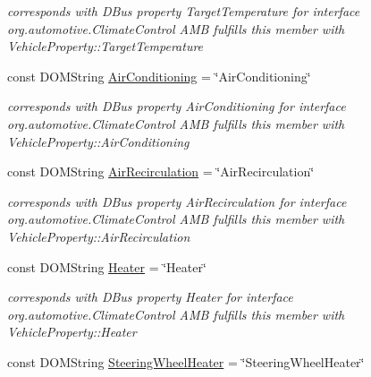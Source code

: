 \begin{DoxyCompactItemize}
\begin{DoxyCompactList}\small\item\em corresponds with D\+Bus property Target\+Temperature for interface org.\+automotive.\+Climate\+Control A\+M\+B fulfills this member with Vehicle\+Property\+::\+Target\+Temperature \end{DoxyCompactList}\item 
\hypertarget{interfaceClimateControl_a9ff614cf24e39060d34b088eb236bbb2}{const D\+O\+M\+String \hyperlink{interfaceClimateControl_a9ff614cf24e39060d34b088eb236bbb2}{Air\+Conditioning} = \char`\"{}Air\+Conditioning\char`\"{}}\label{interfaceClimateControl_a9ff614cf24e39060d34b088eb236bbb2}

\begin{DoxyCompactList}\small\item\em corresponds with D\+Bus property Air\+Conditioning for interface org.\+automotive.\+Climate\+Control A\+M\+B fulfills this member with Vehicle\+Property\+::\+Air\+Conditioning \end{DoxyCompactList}\item 
\hypertarget{interfaceClimateControl_ab72e5a305fcd31445bb825fc59cfff3b}{const D\+O\+M\+String \hyperlink{interfaceClimateControl_ab72e5a305fcd31445bb825fc59cfff3b}{Air\+Recirculation} = \char`\"{}Air\+Recirculation\char`\"{}}\label{interfaceClimateControl_ab72e5a305fcd31445bb825fc59cfff3b}

\begin{DoxyCompactList}\small\item\em corresponds with D\+Bus property Air\+Recirculation for interface org.\+automotive.\+Climate\+Control A\+M\+B fulfills this member with Vehicle\+Property\+::\+Air\+Recirculation \end{DoxyCompactList}\item 
\hypertarget{interfaceClimateControl_a543c57595a9c02c78a4d5cdd0a8115f7}{const D\+O\+M\+String \hyperlink{interfaceClimateControl_a543c57595a9c02c78a4d5cdd0a8115f7}{Heater} = \char`\"{}Heater\char`\"{}}\label{interfaceClimateControl_a543c57595a9c02c78a4d5cdd0a8115f7}

\begin{DoxyCompactList}\small\item\em corresponds with D\+Bus property Heater for interface org.\+automotive.\+Climate\+Control A\+M\+B fulfills this member with Vehicle\+Property\+::\+Heater \end{DoxyCompactList}\item 
\hypertarget{interfaceClimateControl_a604d4c5dcfb03b1a8bfee77ad2fddfa7}{const D\+O\+M\+String \hyperlink{interfaceClimateControl_a604d4c5dcfb03b1a8bfee77ad2fddfa7}{Steering\+Wheel\+Heater} = \char`\"{}Steering\+Wheel\+Heater\char`\"{}}\label{interfaceClimateControl_a604d4c5dcfb03b1a8bfee77ad2fddfa7}


\end{DoxyCompactItemize}
